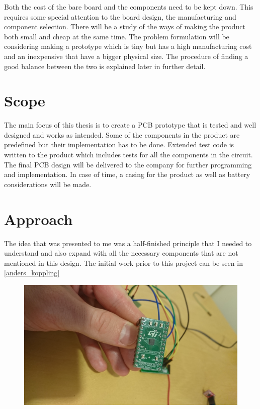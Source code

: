 Both the cost of the bare board and the components need to be kept down.  This requires some special attention to the board design, the manufacturing and component selection.
There will be a study of the ways of making the product both small and cheap at the same time. The problem formulation will be considering making a prototype which is tiny but has a high manufacturing cost and an inexpensive that have a bigger physical size. The procedure of finding a good balance between the two is explained later in further detail.

\section{Scope}
The main focus of this thesis is to create a PCB prototype that is tested and well designed and works as intended. Some of the components in the product are predefined but their implementation has to be done.
Extended test code is written to the product which includes tests for all the components in the circuit.  
The final PCB design will be delivered to the company for further programming and implementation.
In case of time, a casing for the product as well as battery considerations will be made.

\newpage
\section{Approach}
The idea that was presented to me was a half-finished principle that I needed to understand and also expand with all the necessary components that are not mentioned in this design. The initial work prior to this project can be seen in \autoref{anders_koppling}

\begin{figure}[H] 
	\centering 
	\includegraphics[width=.8\linewidth]{Figures/DSC_0103} 
	\label{fig:anders_koppling} 
\end{figure} 

